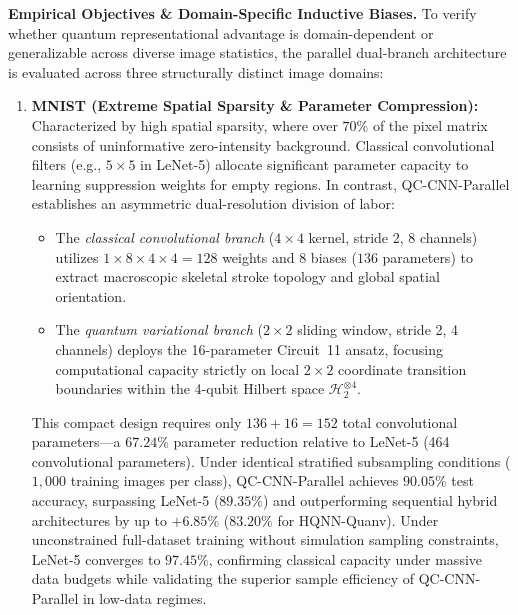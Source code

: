 \documentclass[pdflatex,sn-mathphys-num]{sn-jnl}%
\theoremstyle{thmstyleone}%
\theoremstyle{thmstyletwo}%
\theoremstyle{thmstylethree}%
\begin{document}
\textbf{Empirical Objectives \& Domain-Specific Inductive Biases.} 
To verify whether quantum representational advantage is domain-dependent or generalizable across diverse image statistics, the parallel dual-branch architecture is evaluated across three structurally distinct image domains:
\begin{enumerate}
    \item \textbf{MNIST (Extreme Spatial Sparsity \& Parameter Compression):} 
    Characterized by high spatial sparsity, where over $70\%$ of the pixel matrix consists of uninformative zero-intensity background. Classical convolutional filters (e.g., $5 \times 5$ in LeNet-5) allocate significant parameter capacity to learning suppression weights for empty regions. In contrast, QC-CNN-Parallel establishes an asymmetric dual-resolution division of labor:
    \begin{itemize}
        \item The \textit{classical convolutional branch} ($4 \times 4$ kernel, stride 2, 8 channels) utilizes $1 \times 8 \times 4 \times 4 = 128$ weights and 8 biases ($136$ parameters) to extract macroscopic skeletal stroke topology and global spatial orientation.
        \item The \textit{quantum variational branch} ($2 \times 2$ sliding window, stride 2, 4 channels) deploys the 16-parameter Circuit~11 ansatz, focusing computational capacity strictly on local $2 \times 2$ coordinate transition boundaries within the 4-qubit Hilbert space $\mathcal{H}_2^{\otimes 4}$.
    \end{itemize}
    This compact design requires only $136 + 16 = 152$ total convolutional parameters---a $67.24\%$ parameter reduction relative to LeNet-5 (464 convolutional parameters). Under identical stratified subsampling conditions ($1,000$ training images per class), QC-CNN-Parallel achieves $90.05\%$ test accuracy, surpassing LeNet-5 ($89.35\%$) and outperforming sequential hybrid architectures by up to $+6.85\%$ ($83.20\%$ for HQNN-Quanv). Under unconstrained full-dataset training without simulation sampling constraints, LeNet-5 converges to $97.45\%$, confirming classical capacity under massive data budgets while validating the superior sample efficiency of QC-CNN-Parallel in low-data regimes.


\end{enumerate}
\end{document}
